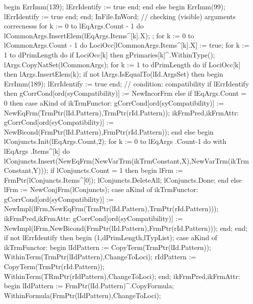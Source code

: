          begin ErrImm(139); lErrIdentify := true end;
      end
      else
      begin ErrImm(99); lErrIdentify := true end;
   end;
   InFile.InWord;
   // checking (visible) arguments correcnesss
   for k  :=  0 to lEqArgs.Count - 1 do
      lCommonArgs.InsertElem(lEqArgs.Items^[k].X);
   ;
   for k  :=  0 to lCommonArgs.Count - 1 do
      LociOcc[lCommonArgs.Items^[k].X] := true;
   for k := 1 to dPrimLength do
      if LociOcc[k] then
         gPrimaries[k]^.WithinType();
   lArgs.CopyNatSet(lCommonArgs);
   for k := 1 to dPrimLength do
      if LociOcc[k] then
         lArgs.InsertElem(k);
   if not lArgs.IsEqualTo(lId.ArgsSet) then
   begin ErrImm(189); lErrIdentify := true end;
   //  condition: compatibility
   if lErrIdentify then
      gCorrCond[ord(syCompatibility)] := NewIncorFrm
   else if lEqArgs.Count = 0 then
      case aKind of
         ikTrmFunctor:
            gCorrCond[ord(syCompatibility)] := NewEqFrm(TrmPtr(lId.Pattern),TrmPtr(rId.Pattern));
         ikFrmPred,ikFrmAttr:
            gCorrCond[ord(syCompatibility)] := NewBicond(FrmPtr(lId.Pattern),FrmPtr(rId.Pattern));
      end
   else
   begin
      lConjuncts.Init(lEqArgs.Count,2);
      for k := 0 to lEqArgs .Count-1 do
         with lEqArgs .Items^[k] do
            lConjuncts.Insert(NewEqFrm(NewVarTrm(ikTrmConstant,X),NewVarTrm(ikTrmConstant,Y)));
      if lConjuncts.Count = 1 then
      begin
         lFrm := FrmPtr(lConjuncts.Items^[0]);
         lConjuncts.DeleteAll; lConjuncts.Done;
      end
      else lFrm := NewConjFrm(lConjuncts);
   case aKind of
      ikTrmFunctor:
         gCorrCond[ord(syCompatibility)] := 
         NewImpl(lFrm,NewEqFrm(TrmPtr(lId.Pattern),TrmPtr(rId.Pattern)));
      ikFrmPred,ikFrmAttr:
         gCorrCond[ord(syCompatibility)] := 
                   NewImpl(lFrm,NewBicond(FrmPtr(lId.Pattern),FrmPtr(rId.Pattern)));
   end;
   end;
   if not lErrIdentify then
   begin
      (1,dPrimLength,lTypList);
      case aKind of
         ikTrmFunctor:
            begin
               lIdPattern := CopyTerm(TrmPtr(lId.Pattern));
               WithinTerm(TrmPtr(lIdPattern),ChangeToLoci);
               rIdPattern := CopyTerm(TrmPtr(rId.Pattern));
               WithinTerm(TRmPtr(rIdPattern),ChangeToLoci);
            end;
         ikFrmPred,ikFrmAttr:
            begin
               lIdPattern := FrmPtr(lId.Pattern)^.CopyFormula;
               WithinFormula(FrmPtr(lIdPattern),ChangeToLoci);
